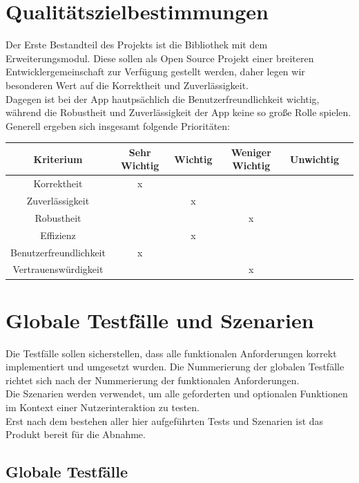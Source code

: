 \documentclass[a4paper,12pt]{article}
\begin{document}
\section{Qualitätszielbestimmungen}
Der Erste Bestandteil des Projekts ist die Bibliothek mit dem Erweiterungsmodul. Diese sollen als Open Source Projekt einer breiteren Entwicklergemeinschaft zur Verfügung gestellt werden, daher legen wir besonderen Wert auf die Korrektheit und Zuverlässigkeit.\\
Dagegen ist bei der App hautpsächlich die Benutzerfreundlichkeit wichtig, während die Robustheit und Zuverlässigkeit der App keine so große Rolle spielen. Generell ergeben sich insgesamt folgende Prioritäten:\\
\begin{tabular}[t]{|c|c|c|c|c|c|}
  \hline
  \textbf{Kriterium} & \textbf{Sehr Wichtig} & \textbf{Wichtig} & \textbf{Weniger Wichtig} & \textbf{Unwichtig}\\
  \hline
  \hline
  Korrektheit & x & & &\\ %
  \hline
  Zuverlässigkeit & & x & &\\ %
  \hline
  Robustheit & & & x &\\  %
  \hline
  Effizienz & & x & &\\ %
  \hline
  Benutzerfreundlichkeit & x & & &\\ %
  \hline
  Vertrauenswürdigkeit & & & x &\\ %
  \hline

\end{tabular}

\section{Globale Testfälle und Szenarien}
Die Testfälle sollen sicherstellen, dass alle funktionalen Anforderungen korrekt implementiert und umgesetzt wurden.
Die Nummerierung der globalen Testfälle richtet sich nach der Nummerierung der funktionalen Anforderungen.\\
Die Szenarien werden verwendet, um alle geforderten und optionalen Funktionen im Kontext einer Nutzerinteraktion zu testen.\\
Erst nach dem bestehen aller hier aufgeführten Tests und Szenarien ist das Produkt bereit für die Abnahme.
  \subsection{Globale Testfälle}
\end{document}
